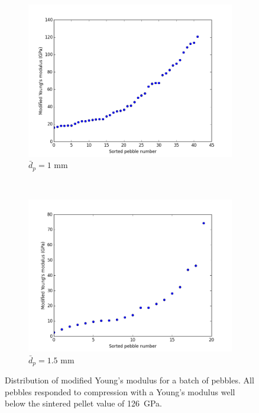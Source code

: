 \begin{figure}
        \centering
        \begin{subfigure}[b]{\doubleimagewidth}
                \includegraphics[width=\textwidth]{chapters/figures/nfri-1mm-E-plot.png}
                \caption{$\bar{d}_p = 1$ mm}
                \label{fig:nfri-1mm-E-plot}
        \end{subfigure}
        ~
        \begin{subfigure}[b]{\doubleimagewidth}
                \includegraphics[width=\textwidth]{chapters/figures/nfri-1.5mm-E-plot.png}
                \caption{$\bar{d}_p = 1.5$ mm}
                \label{fig:nfri-1.5mm-E-plot}
        \end{subfigure}
        \caption{Distribution of modified Young's modulus for a batch of \lit pebbles. All pebbles responded to compression with a Young's modulus well below the sintered pellet value of \si{126 GPa}.}\label{fig:nfri-E-plot}
\end{figure}


